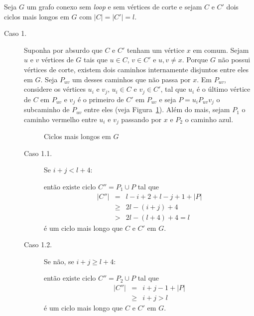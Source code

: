 
Seja $G$ um grafo conexo sem \emph{loop} e sem vértices de corte e sejam $C$
e $C'$ dois ciclos mais longos em $G$ com $|C| = |C'| = l$.

\begin{description}

\item[Caso 1.] Suponha por absurdo que $C$ e $C'$ tenham um vértice $x$ em
comum. Sejam $u$ e $v$ vértices de $G$ tais que $u \in C$, $v \in C'$ e $u,v
\ne x$. Porque $G$ não possui vértices de corte, existem dois caminhos
internamente disjuntos entre eles em $G$. Seja $P_{uv}$ um desses caminhos que
não passa por $x$. Em $P_{uv}$, considere os vértices $u_i$ e $v_j$, $u_i \in
C$ e $v_j \in C'$, tal que $u_i$ é o último vértice de $C$ em $P_{uv}$ e $v_j$
é o primeiro de $C'$ em $P_{uv}$ e seja $P = u_iP_{uv}v_j$ o subcaminho de
$P_{uv}$ entre eles (veja Figura~\ref{fig:ciclos}). Além do mais, sejam $P_1$ o
caminho vermelho entre $u_i$ e $v_j$ passando por $x$ e $P_2$ o caminho azul.

\begin{figure}[htb]
    \centering
    \def\svgwidth{7.67cm}
    
    \caption{Ciclos mais longos em $G$}
    \label{fig:ciclos}
\end{figure}

\begin{description}
    \item[Caso 1.1.] Se $i + j < l + 4$:

    então existe ciclo $C'' = P_1 \cup P$ tal que
    \begin{eqnarray}
        |C''| &=& l - i + 2 + l - j + 1 + |P| \nonumber \\
            &\ge& 2l - (i + j) + 4 \nonumber \\
            &>& 2l - (l + 4) + 4 = l \nonumber
    \end{eqnarray}
    é um ciclo mais longo que $C$ e $C'$ em $G$.

    \item[Caso 1.2.] Se não, se $i + j \ge l + 4$:

    então existe ciclo $C'' = P_2 \cup P$ tal que
    \begin{eqnarray}
        |C''| &=& i + j - 1 + |P| \nonumber \\
             &\ge& i + j > l \nonumber
    \end{eqnarray}
    é um ciclo mais longo que $C$ e $C'$ em $G$.
\end{description}


\end{description}
